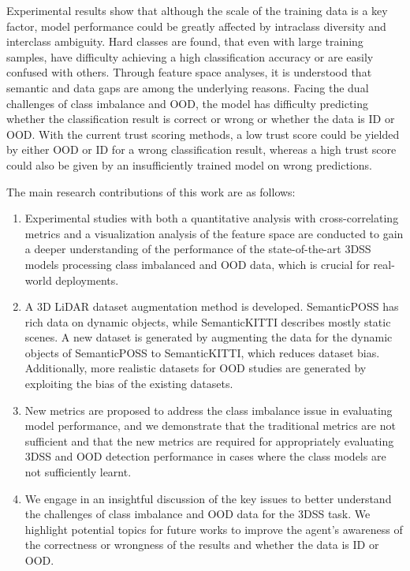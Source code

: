\documentclass[journal]{IEEEtran}
\begin{document}
Experimental results show that although the scale of the training data is a key factor, model performance could be greatly affected by intraclass diversity and interclass ambiguity. Hard classes are found, that even with large training samples, have difficulty achieving a high classification accuracy or are easily confused with others. Through feature space analyses, it is understood that semantic and data gaps are among the underlying reasons. Facing the dual challenges of class imbalance and OOD, the model has difficulty predicting whether the classification result is correct or wrong or whether the data is ID or OOD. With the current trust scoring methods, a low trust score could be yielded by either OOD or ID for a wrong classification result, whereas a high trust score could also be given by an insufficiently trained model on wrong predictions. 

The main research contributions of this work are as follows:

\begin{enumerate}
	\item Experimental studies with both a quantitative analysis with cross-correlating metrics and a visualization analysis of the feature space are conducted to gain a deeper understanding of the performance of the state-of-the-art 3DSS models processing class imbalanced and OOD data, which is crucial for real-world deployments.
	
	\item A 3D LiDAR dataset augmentation method is developed. SemanticPOSS has rich data on dynamic objects, while SemanticKITTI describes mostly static scenes. A new dataset is generated by augmenting the data for the dynamic objects of SemanticPOSS to SemanticKITTI, which reduces dataset bias. Additionally, more realistic datasets for OOD studies are generated by exploiting the bias of the existing datasets.
	
	\item New metrics are proposed to address the class imbalance issue in evaluating model performance, and we demonstrate that the traditional metrics are not sufficient and that the new metrics are required for appropriately evaluating 3DSS and OOD detection performance in cases where the class models are not sufficiently learnt.
	
	\item We engage in an insightful discussion of the key issues to better understand the challenges of class imbalance and OOD data for the 3DSS task. We highlight potential topics for future works to improve the agent's awareness of the correctness or wrongness of the results and whether the data is ID or OOD.
	
\end{enumerate}
\end{document}
